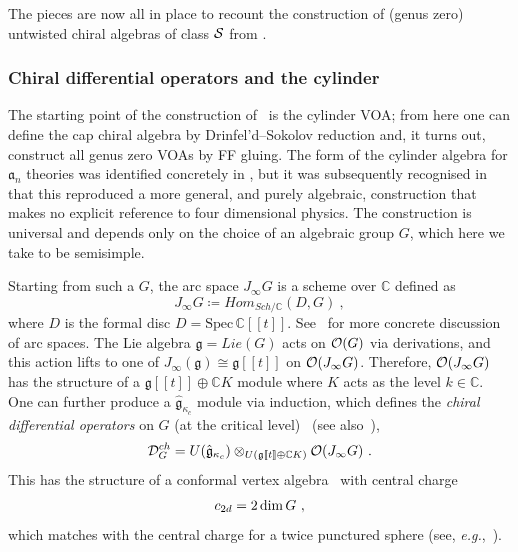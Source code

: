 \documentclass[a4paper]{article}
\def\IC{\mathbb{C}}
\def\OO{{\cal O}}
\def\SS{{\cal S}}
\def\dim{{\rm dim}}
\def\af{\mathfrak{a}}
\def\gf{\mathfrak{g}}
\def \eg{{\it e.g.}}
\def\D{\mathcal{D}^{ch}}
\begin{document}
The pieces are now all in place to recount the construction of (genus zero) untwisted chiral algebras of class $\SS$ from \cite{Arakawa:2018egx}.

\subsubsection*{Chiral differential operators and the cylinder}
\label{ssec:chiral_background/cylinder}

The starting point of the construction of~\cite{Arakawa:2018egx} is the cylinder VOA; from here one can define the cap chiral algebra by Drinfel'd--Sokolov reduction and, it turns out, construct all genus zero VOAs by FF gluing. The form of the cylinder algebra for $\af_n$ theories was identified concretely in \cite{Beem:2014rza}, but it was subsequently recognised in \cite{Arakawa:2015ro} that this reproduced a more general, and purely algebraic, construction that makes no explicit reference to four dimensional physics. The construction is universal and depends only on the choice of an algebraic group $G$, which here we take to be semisimple.

Starting from such a $G$, the arc space $J_\infty G$ is a scheme over $\IC$ defined as
\begin{equation}
    J_\infty G \coloneqq Hom_{Sch/\IC}(D, G)~,
\end{equation}
where $D$ is the formal disc $D=\mathrm{Spec}\, \IC[\![t]\!]$. See~\cite{Arakawa2017introduction} for more concrete discussion of arc spaces. The Lie algebra $\gf=Lie(G)$ acts on $\OO(G)$ via derivations, and this action lifts to one of $J_\infty(\gf)\cong \gf[\![t]\!]$ on $\OO(J_\infty G)$. Therefore, $\OO(J_\infty G)$ has the structure of a $\gf[\![t]\!]\oplus \IC K$ module where $K$ acts as the level $k\in\IC$. One can further produce a $\hat{\gf}_{\kappa_c}$ module via induction, which defines the \emph{chiral differential operators} on $G$ (at the critical level)~\cite{ag} (see also~\cite{Gorbounov:1992,Gorbounov:2001,Gorbounov:2004, Malikov:1999}),
\begin{equation}
	\D_G = U(\hat{\gf}_{\kappa_c})\otimes_{U(\gf[\![t]\!]\oplus \IC K)}\OO(J_\infty G)~.
\end{equation}
This has the structure of a conformal vertex algebra~\cite{Gorbounov:2001} with central charge
\begin{equation}
	c_{2d} = 2\,\dim\, G~,
\end{equation}
which matches with the central charge for a twice punctured sphere (see, \eg,~\cite{Chacaltana:2012zy}).
\end{document}
